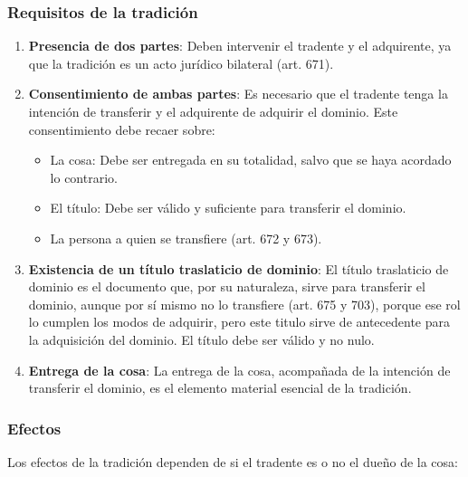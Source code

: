 \documentclass{templateNote}
\begin{document}
\subsubsection{Requisitos de la tradición}
\begin{enumerate}[label=\alph*)]
    \item \textbf{Presencia de dos partes}: Deben intervenir el tradente y el adquirente, ya que la tradición es un acto jurídico bilateral (art. 671).
    \item \textbf{Consentimiento de ambas partes}: Es necesario que el tradente tenga la intención de transferir y el adquirente de adquirir el dominio. Este consentimiento debe recaer sobre:
    \begin{itemize}
        \item La cosa: Debe ser entregada en su totalidad, salvo que se haya acordado lo contrario.
        \item El título: Debe ser válido y suficiente para transferir el dominio.
        \item La persona a quien se transfiere (art. 672 y 673).
    \end{itemize}
    \item \textbf{Existencia de un título traslaticio de dominio}: El título traslaticio de dominio es el documento que, por su naturaleza, sirve para transferir el dominio, aunque por sí mismo no lo transfiere (art. 675 y 703), porque ese rol lo cumplen los modos de adquirir, pero este titulo sirve de antecedente para la adquisición del dominio. El título debe ser válido y no nulo.
    \item \textbf{Entrega de la cosa}: La entrega de la cosa, acompañada de la intención de transferir el dominio, es el elemento material esencial de la tradición.
\end{enumerate}

\subsubsection{Efectos}
Los efectos de la tradición dependen de si el tradente es o no el dueño de la cosa:
\end{document}
